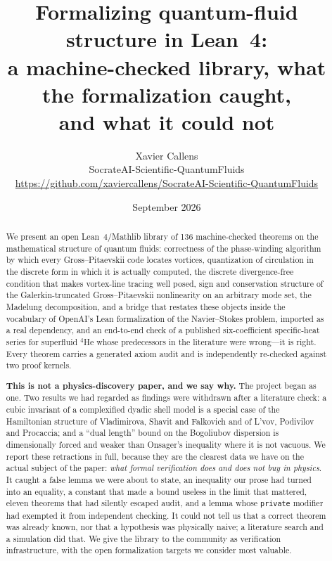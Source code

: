 \documentclass[11pt,a4paper]{article}
\title{\textbf{Formalizing quantum-fluid structure in Lean~4:}\\
\large a machine-checked library, what the formalization caught,\\ and what it could not}
\author{Xavier Callens\\
\small SocrateAI-Scientific-QuantumFluids\\
\small \url{https://github.com/xaviercallens/SocrateAI-Scientific-QuantumFluids}}
\date{September 2026}
\theoremstyle{definition}
\begin{document}
\maketitle

\begin{abstract}
\noindent
We present an open Lean~4/Mathlib library of 136 machine-checked theorems on the mathematical
structure of quantum fluids: correctness of the phase-winding algorithm by which every
Gross--Pitaevskii code locates vortices, quantization of circulation in the discrete form in
which it is actually computed, the discrete divergence-free condition that makes vortex-line
tracing well posed, sign and conservation structure of the Galerkin-truncated
Gross--Pitaevskii nonlinearity on an arbitrary mode set, the Madelung decomposition, and a
bridge that restates these objects inside the vocabulary of OpenAI's Lean formalization of
the Navier--Stokes problem, imported as a real dependency, and an end-to-end check of a published
six-coefficient specific-heat series for superfluid $^4$He whose predecessors in the literature were
wrong---it is right. Every theorem carries a generated
axiom audit and is independently re-checked against two proof kernels.

\textbf{This is not a physics-discovery paper, and we say why.} The project began as one. Two
results we had regarded as findings were withdrawn after a literature check: a cubic
invariant of a complexified dyadic shell model is a special case of the Hamiltonian
structure of Vladimirova, Shavit and Falkovich and of L'vov, Podivilov and Procaccia; and a
``dual length'' bound on the Bogoliubov dispersion is dimensionally forced and weaker than
Onsager's inequality where it is not vacuous. We report these retractions in full, because
they are the clearest data we have on the actual subject of the paper: \emph{what formal
verification does and does not buy in physics}. It caught a false lemma we were about to
state, an inequality our prose had turned into an equality, a constant that made a bound
useless in the limit that mattered, eleven theorems that had silently escaped audit, and a
lemma whose \texttt{private} modifier had exempted it from independent checking. It
could not tell us that a correct theorem was already known, nor that a hypothesis was
physically naive; a literature search and a simulation did that. We give the library to the
community as verification infrastructure, with the open formalization targets we consider
most valuable.
\end{abstract}
\end{document}
